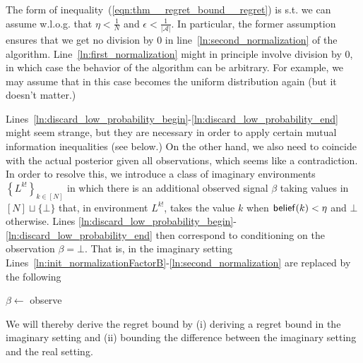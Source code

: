 \documentclass[anon,12pt]{colt2018} %
\newcommand{\AC}[1]{\left\{#1\right\}}
\newcommand{\Abs}[1]{\left\vert #1 \right\vert}
\newcommand{\A}{\mathcal{A}}
\newcommand{\Rev}{\beta}
\begin{document}
The form of inequality~(\ref{eqn:thm__regret_bound__regret}) is s.t. we can assume w.l.o.g. that $\eta < \frac{1}{N}$ and $\epsilon < \frac{1}{\Abs{\A}}$. In particular, the former assumption ensures that we get no division by 0 in line~\ref{ln:second_normalization} of the algorithm. Line~\ref{ln:first_normalization} might in principle involve division by 0, in which case the behavior of the algorithm can be arbitrary. For example, we may assume that in this case  becomes the uniform distribution again (but it doesn't matter.)

Lines~\ref{ln:discard_low_probability_begin}-\ref{ln:discard_low_probability_end} might seem strange, but they are necessary in order to apply certain mutual information inequalities (see below.) On the other hand, we also need  to coincide with the actual posterior given all observations, which seems like a contradiction. In order to resolve this, we introduce a class of imaginary environments $\AC{L^{k!}}_{k\in[N]}$ in which there is an additional observed signal $\Rev$ taking values in $[N]\sqcup\{\bot\}$ that, in environment $L^{k!}$, takes the value $k$ when $\DataSty{belief}(k) < \eta$ and $\bot$ otherwise. Lines \ref{ln:discard_low_probability_begin}-\ref{ln:discard_low_probability_end} then correspond to conditioning  on the observation $\beta=\bot$. That is, in the imaginary setting Lines~\ref{ln:init_normalizationFactorB}-\ref{ln:second_normalization} are replaced by the following

\begin{algorithm}

\setcounter{AlgoLine}{23}

$\beta\leftarrow$ observe


\end{algorithm}

We will thereby derive the regret bound by (i) deriving a regret bound in the imaginary setting and (ii) bounding the difference between the imaginary setting and the real setting.
\end{document}
